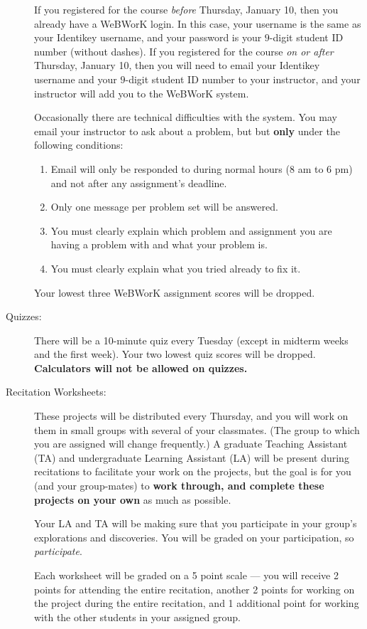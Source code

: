 \documentclass[11pt]{article}
\begin{document}
\begin{description}
  If you registered for the course \emph{before} Thursday, January 10,
  then you already have a WeBWorK login. In this case, your username
  is the same as your Identikey username, and your password is your
  $9$-digit student ID number (without dashes). If you registered for
  the course \emph{on or after} Thursday, January 10, then you will
  need to email your Identikey username and your $9$-digit student ID
  number to your instructor, and your instructor will add you to the
  WeBWorK system.

  Occasionally there are technical difficulties with the system. You
  may email your instructor to ask about a problem, but but
  \textbf{only} under the following conditions:
  \begin{enumerate}
  \item Email will only be responded to during normal hours (8 am to 6
    pm) and not after any assignment's deadline.
  \item Only one message per problem set will be answered.
  \item You must clearly explain which problem and assignment you are
    having a problem with and what your problem is.
  \item You must clearly explain what you tried already to fix it.
  \end{enumerate}
  Your lowest three WeBWorK assignment scores will be dropped.

\item[Quizzes:] There will be a 10-minute quiz every Tuesday (except in
  midterm weeks and the first week).  Your two lowest quiz scores will
  be dropped. \textbf{Calculators will not be allowed on quizzes.}

\item[Recitation Worksheets:] These projects will be distributed every
  Thursday, and you will work on them in small groups with several of
  your classmates. (The group to which you are assigned will change
  frequently.)  A graduate Teaching Assistant (TA) and undergraduate
  Learning Assistant (LA) will be present during recitations to
  facilitate your work on the projects, but the goal is for you (and
  your group-mates) to \textbf{work through, and complete these
    projects on your own} as much as possible.

  Your LA and TA will be making sure that you participate in your
  group's explorations and discoveries.  You will be graded on your
  participation, so {\it participate}.

  Each worksheet will be graded on a 5 point scale --- you will
  receive 2 points for attending the entire recitation, another 2
  points for working on the project during the entire recitation, and
  1 additional point for working with the other students in your
  assigned group.


\end{description}
\end{document}
